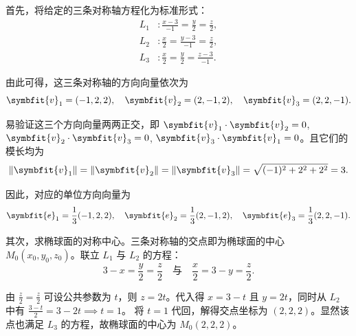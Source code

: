 \begin{solution}
    首先，将给定的三条对称轴方程化为标准形式：
    \begin{equation}
        \begin{aligned}
            L_1 & \colon \frac{x - 3}{-1} = \frac{y}{2} = \frac{z}{2}, \\
            L_2 & \colon \frac{x}{2} = \frac{y - 3}{-1} = \frac{z}{2}, \\
            L_3 & \colon \frac{x}{2} = \frac{y}{2} = \frac{z - 3}{-1}.
        \end{aligned}
    \end{equation}

    由此可得，这三条对称轴的方向向量依次为
    \begin{equation}
        \symbfit{v}_1 = (-1, 2, 2), \quad \symbfit{v}_2 = (2, -1, 2), \quad \symbfit{v}_3 = (2, 2, -1).
    \end{equation}

    易验证这三个方向向量两两正交，即 $\symbfit{v}_1 \cdot \symbfit{v}_2 = 0$, $\symbfit{v}_2 \cdot \symbfit{v}_3 = 0$, $\symbfit{v}_3 \cdot \symbfit{v}_1 = 0$。且它们的模长均为
    \begin{equation}
        \|\symbfit{v}_1\| = \|\symbfit{v}_2\| = \|\symbfit{v}_3\| = \sqrt{(-1)^2 + 2^2 + 2^2} = 3.
    \end{equation}

    因此，对应的单位方向向量为
    \begin{equation}
        \symbfit{e}_1 = \frac{1}{3}(-1, 2, 2), \quad \symbfit{e}_2 = \frac{1}{3}(2, -1, 2), \quad \symbfit{e}_3 = \frac{1}{3}(2, 2, -1).
    \end{equation}

    其次，求椭球面的对称中心。三条对称轴的交点即为椭球面的中心 $M_0(x_0, y_0, z_0)$。联立 $L_1$ 与 $L_2$ 的方程：
    \begin{equation}
        3 - x = \frac{y}{2} = \frac{z}{2} \quad \text{与} \quad \frac{x}{2} = 3 - y = \frac{z}{2}.
    \end{equation}

    由 $\frac{z}{2} = \frac{z}{2}$ 可设公共参数为 $t$，则 $z = 2t$。代入得 $x = 3 - t$ 且 $y = 2t$，同时从 $L_2$ 中有 $\frac{3 - t}{2} = 3 - 2t \implies t = 1$。
    将 $t = 1$ 代回，解得交点坐标为 $(2, 2, 2)$。显然该点也满足 $L_3$ 的方程，故椭球面的中心为 $M_0(2, 2, 2)$。


\end{solution}
